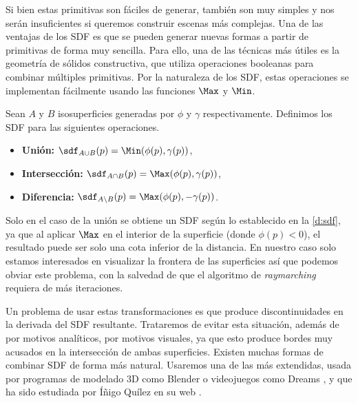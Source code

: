 
Si bien estas primitivas son fáciles de generar, también son muy simples y nos serán insuficientes si queremos construir escenas más complejas. Una de las ventajas de los SDF es que se pueden generar nuevas formas a partir de primitivas de forma muy sencilla. Para ello, una de las técnicas más útiles es la geometría de sólidos constructiva, que utiliza operaciones booleanas para combinar múltiples primitivas. Por la naturaleza de los SDF, estas operaciones se implementan fácilmente usando las funciones $\Max$ y $\Min$.

\begin{definicion}\label{p:boolean}
    Sean $A$ y $B$ isosuperficies generadas por $\phi$ y $\gamma$ respectivamente. Definimos los SDF para las siguientes operaciones.
    \begin{itemize}
        \item \textbf{Unión: } $\sdf_{A\cup B}(p) = \Min(\phi(p), \gamma(p))$,
        \item \textbf{Intersección: } $\sdf_{A\cap B}(p) = \Max(\phi(p), \gamma(p))$,
        \item \textbf{Diferencia: } $\sdf_{A\setminus B}(p) = \Max(\phi(p), -\gamma(p))$.
    \end{itemize}
\end{definicion}

\begin{observacion}
    Solo en el caso de la unión se obtiene un SDF según lo establecido en la \autoref{d:sdf}, ya que al aplicar $\Max$ en el interior de la superficie (donde $\phi(p) < 0$), el resultado puede ser solo una cota inferior de la distancia. En nuestro caso solo estamos interesados en visualizar la frontera de las superficies así que podemos obviar este problema, con la salvedad de que el algoritmo de \textit{raymarching} requiera de más iteraciones.
\end{observacion}

Un problema de usar estas transformaciones es que produce discontinuidades en la derivada del SDF resultante. Trataremos de evitar esta situación, además de por motivos analíticos, por motivos visuales, ya que esto produce bordes muy acusados en la intersección de ambas superficies. Existen muchas formas de combinar SDF de forma más natural. Usaremos una de las más extendidas, usada por programas de modelado 3D como Blender \cite{repo:blender} o videojuegos como Dreams \cite{game:dreams}, y que ha sido estudiada por Íñigo Quílez en su web \cite{article:smooth}.

